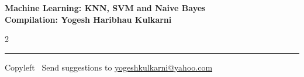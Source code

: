\documentclass[8pt,landscape]{article}
\begin{document}
\footnotesize


\begin{center}
\Large{\textbf{Machine Learning: KNN, SVM and Naive Bayes\\ Compilation: Yogesh Haribhau Kulkarni}}
\end{center}

\begin{multicols}{2}

\end{multicols}

\rule{\linewidth}{0.25pt}
\scriptsize
Copyleft \textcopyleft\  Send suggestions to
\href{http://www.yogeshkulkarni.com}{yogeshkulkarni@yahoo.com}
\end{document}
